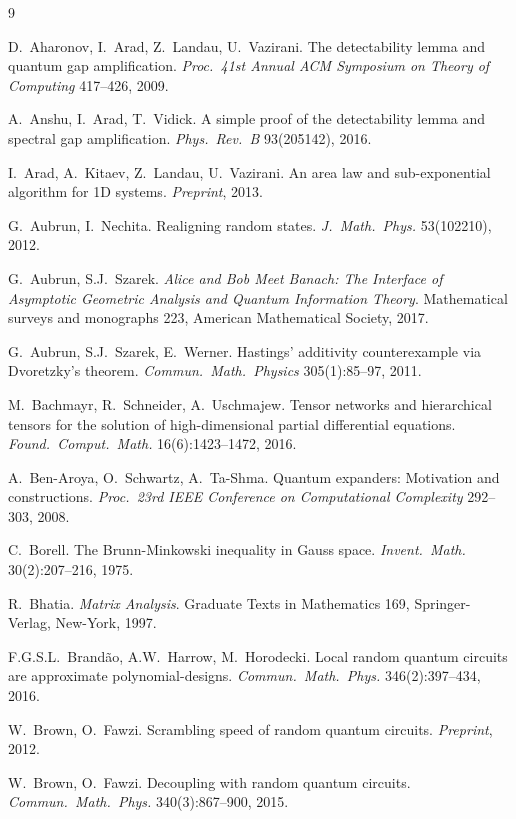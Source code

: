 \documentclass{amsart}
\begin{document}
\begin{thebibliography}{9}

     D.~Aharonov, I.~Arad, Z.~Landau, U.~Vazirani. The detectability lemma and quantum gap amplification. \textit{Proc.~41st Annual ACM Symposium on Theory of Computing} 417--426, 2009.

     A.~Anshu, I.~Arad, T.~Vidick. A simple proof of the detectability lemma and spectral gap amplification. \textit{Phys.~Rev.~B} 93(205142), 2016.

     I.~Arad, A.~Kitaev, Z.~Landau, U.~Vazirani. An area law and sub-exponential algorithm for 1D systems. \textit{Preprint}, 2013.

     G.~Aubrun, I.~Nechita. Realigning random states. \textit{J.~Math.~Phys.} 53(102210), 2012.

     G.~Aubrun, S.J.~Szarek. \textit{Alice and Bob Meet Banach: The Interface of Asymptotic Geometric Analysis and Quantum Information Theory}. Mathematical surveys and monographs 223, American Mathematical Society, 2017.

     G.~Aubrun, S.J.~Szarek, E.~Werner. Hastings' additivity counterexample via Dvoretzky's theorem. \textit{Commun.~Math.~Physics} 305(1):85--97, 2011.

     M.~Bachmayr, R.~Schneider, A.~Uschmajew. Tensor networks and hierarchical tensors for the solution of high-dimensional partial differential equations. \textit{Found.~Comput.~Math.} 16(6):1423--1472, 2016.

     A.~Ben-Aroya, O.~Schwartz, A.~Ta-Shma. Quantum  expanders: Motivation and constructions. \textit{Proc.~23rd IEEE Conference on Computational Complexity} 292--303, 2008.

     C.~Borell. The Brunn-Minkowski inequality in Gauss space. \textit{Invent.~Math.} 30(2):207--216, 1975.

     R.~Bhatia. \textit{Matrix Analysis}. Graduate Texts in Mathematics 169, Springer-Verlag, New-York, 1997.

     F.G.S.L.~Brand\~{a}o, A.W.~Harrow, M.~Horodecki. Local random quantum circuits are approximate polynomial-designs. \textit{Commun.~Math.~Phys.} 346(2):397--434, 2016.

     W.~Brown, O.~Fawzi. Scrambling speed of random quantum circuits. \textit{Preprint}, 2012.

     W.~Brown, O.~Fawzi. Decoupling with random quantum circuits. \textit{Commun.~Math.~Phys.} 340(3):867--900, 2015.


\end{thebibliography}
\end{document}
